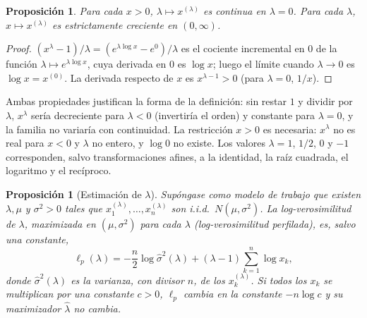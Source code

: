 \documentclass[11pt,a4paper]{article}
\theoremstyle{plain}
\newtheorem{proposicion}[teorema]{Proposición}
\theoremstyle{definition}
\theoremstyle{remark}
\newcommand{\1}{\mathbf{1}}
\begin{document}
\begin{proposicion}\label{prop:bc-basicas}
Para cada $x>0$, $\lambda\mapsto x^{(\lambda)}$ es continua en
$\lambda=0$. Para cada $\lambda$, $x\mapsto x^{(\lambda)}$ es
estrictamente creciente en $(0,\infty)$.
\end{proposicion}

\begin{proof}
$(x^\lambda-1)/\lambda=(e^{\lambda\log x}-e^{0})/\lambda$ es el cociente
incremental en $0$ de la función $\lambda\mapsto e^{\lambda\log x}$, cuya
derivada en $0$ es $\log x$; luego el límite cuando $\lambda\to0$ es
$\log x=x^{(0)}$. La derivada respecto de $x$ es $x^{\lambda-1}>0$ (para
$\lambda=0$, $1/x$).
\end{proof}

Ambas propiedades justifican la forma de la definición: sin restar $1$ y
dividir por $\lambda$, $x^\lambda$ sería decreciente para $\lambda<0$
(invertiría el orden) y constante para $\lambda=0$, y la familia no
variaría con continuidad. La restricción $x>0$ es necesaria: $x^\lambda$
no es real para $x<0$ y $\lambda$ no entero, y $\log0$ no existe. Los
valores $\lambda=1$, $1/2$, $0$ y $-1$ corresponden, salvo transformaciones
afines, a la identidad, la raíz cuadrada, el logaritmo y el recíproco.

\begin{proposicion}[Estimación de $\lambda$]\label{prop:bc}
Supóngase como modelo de trabajo que existen $\lambda,\mu$ y $\sigma^2>0$
tales que $x_1^{(\lambda)},\dots,x_n^{(\lambda)}$ son i.i.d.\
$N(\mu,\sigma^2)$. La log-verosimilitud de $\lambda$, maximizada en
$(\mu,\sigma^2)$ para cada $\lambda$ (log-verosimilitud perfilada), es,
salvo una constante,
\[
\ell_p(\lambda)=-\frac n2\log\hat\sigma^2(\lambda)+(\lambda-1)\sum_{k=1}^n\log x_k,
\]
donde $\hat\sigma^2(\lambda)$ es la varianza, con divisor $n$, de los
$x_k^{(\lambda)}$. Si todos los $x_k$ se multiplican por una constante
$c>0$, $\ell_p$ cambia en la constante $-n\log c$ y su maximizador
$\hat\lambda$ no cambia.
\end{proposicion}
\end{document}
